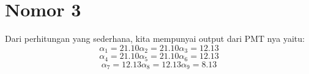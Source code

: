 \section{Nomor 3}
Dari perhitungan yang sederhana, kita mempunyai output dari PMT nya yaitu:
\begin{displaymath}
\alpha _1 = 21.10 \alpha _2 = 21.10 \alpha _3 = 12.13
\end{displaymath}
\begin{displaymath}
\alpha _4 = 21.10 \alpha _5 = 21.10 \alpha _6 = 12.13
\end{displaymath}
\begin{displaymath}
\alpha _7 = 12.13 \alpha _8 = 12.13 \alpha _9 = 8.13
\end{displaymath}